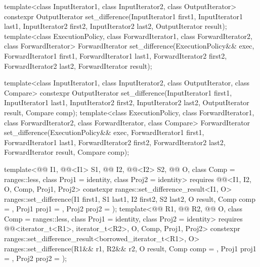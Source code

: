 %
\begin{itemdecl}
template<class InputIterator1, class InputIterator2,
         class OutputIterator>
  constexpr OutputIterator
    set_difference(InputIterator1 first1, InputIterator1 last1,
                   InputIterator2 first2, InputIterator2 last2,
                   OutputIterator result);
template<class ExecutionPolicy, class ForwardIterator1, class ForwardIterator2,
         class ForwardIterator>
  ForwardIterator
    set_difference(ExecutionPolicy&& exec,
                   ForwardIterator1 first1, ForwardIterator1 last1,
                   ForwardIterator2 first2, ForwardIterator2 last2,
                   ForwardIterator result);

template<class InputIterator1, class InputIterator2,
         class OutputIterator, class Compare>
  constexpr OutputIterator
    set_difference(InputIterator1 first1, InputIterator1 last1,
                   InputIterator2 first2, InputIterator2 last2,
                   OutputIterator result, Compare comp);
template<class ExecutionPolicy, class ForwardIterator1, class ForwardIterator2,
         class ForwardIterator, class Compare>
  ForwardIterator
    set_difference(ExecutionPolicy&& exec,
                   ForwardIterator1 first1, ForwardIterator1 last1,
                   ForwardIterator2 first2, ForwardIterator2 last2,
                   ForwardIterator result, Compare comp);

template<@@ I1, @@<I1> S1, @@ I2, @@<I2> S2,
         @@ O, class Comp = ranges::less,
         class Proj1 = identity, class Proj2 = identity>
  requires @@<I1, I2, O, Comp, Proj1, Proj2>
  constexpr ranges::set_difference_result<I1, O>
    ranges::set_difference(I1 first1, S1 last1, I2 first2, S2 last2, O result,
                           Comp comp = {}, Proj1 proj1 = {}, Proj2 proj2 = {});
template<@@ R1, @@ R2, @@ O,
         class Comp = ranges::less, class Proj1 = identity, class Proj2 = identity>
  requires @@<iterator_t<R1>, iterator_t<R2>, O, Comp, Proj1, Proj2>
  constexpr ranges::set_difference_result<borrowed_iterator_t<R1>, O>
    ranges::set_difference(R1&& r1, R2&& r2, O result,
                           Comp comp = {}, Proj1 proj1 = {}, Proj2 proj2 = {});
\end{itemdecl}

